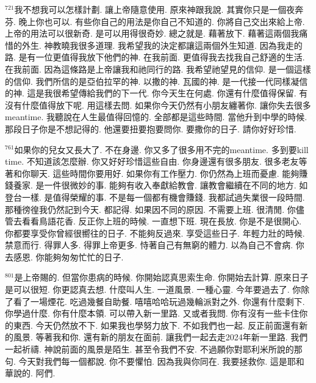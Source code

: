 \documentclass{book}
\begin{document}
$^{721}$我不想我可以怎樣計劃.
讓上帝隨意使用.
原來神跟我說.
其實你只是一個夜奔芬.
晚上你也可以.
有些你自己的用法是你自己不知道的.
你將自己交出來給上帝.
上帝的用法可以很新奇.
是可以用得很奇妙.
總之就是.
藉著放下.
藉著這兩個我痛惜的外生.
神教曉我很多道理.
我希望我的決定都讓這兩個外生知道.
因為我走的路.
是有一位更值得我放下他們的神.
在我前面.
更值得我去找我自己舒適的生活.
在我前面.
因為這條路是上帝讓我和祂同行的路.
我希望祂望見的信仰.
是一個這樣的信仰.
我們所信的是亞伯拉罕的神.
以撒的神.
瓦國的神.
是一代接一代同樣凝信的神.
這是我很希望傳給我們的下一代.
你今天生在何處.
你還有什麼值得保留.
有沒有什麼值得放下呢.
用這樣去問.
如果你今天仍然有小朋友纏著你.
讓你失去很多meantime.
我聽說在人生最值得回憶的.
全部都是這些時間.
當他升到中學的時候.
那段日子你是不想記得的.
他還要扭要抱要問你.
要撒你的日子.
請你好好珍惜.

$^{761}$如果你的兒女又長大了.
不在身邊.
你又多了很多用不完的meantime.
多到要kill time.
不知道該怎麼辦.
你又好好珍惜這些自由.
你身邊還有很多朋友.
很多老友等著和你聊天.
這些時間你要用好.
如果你有工作壓力.
你仍然為上班而憂慮.
能夠賺錢養家.
是一件很微妙的事.
能夠有收入奉獻給教會.
讓教會繼續在不同的地方.
如登台一樣.
是值得榮耀的事.
不是每一個都有機會賺錢.
我都試過失業很一段時間.
那種徬徨我仍然記到今天.
都記得.
如果因不同的原因.
不需要上班.
很清閒.
你儘管去看看鳥語花香.
反正你上班的時候.
一直想下班.
現在長放.
你是不是很開心.
你都要享受你曾經很嚮往的日子.
不能夠反過來.
享受這些日子.
年輕力壯的時候.
禁意而行.
得罪人多.
得罪上帝更多.
恃著自己有無窮的體力.
以為自己不會病.
你去感恩.
你能夠匆匆忙忙的日子.

$^{801}$是上帝賜的.
但當你患病的時候.
你開始認真思索生命.
你開始去計算.
原來日子是可以很短.
你更認真去想.
什麼叫人生.
一道風景.
一種心靈.
今年要過去了.
你除了看了一場煙花.
吃過幾餐自助餐.
嘻嘻哈哈玩過幾輪派對之外.
你還有什麼剩下.
你學過什麼.
你有什麼本領.
可以帶入新一里路.
又或者我問.
你有沒有一些卡住你的東西.
今天仍然放不下.
如果我也學努力放下.
不如我們也一起.
反正前面還有新的風景.
等著我和你.
還有新的朋友在面前.
讓我們一起去走2024年新一里路.
我們一起祈禱.
神說前面的風景是陌生.
甚至令我們不安.
不過願你對耶利米所說的那句.
今天對我們每一個都說.
你不要懼怕.
因為我與你同在.
我要拯救你.
這是耶和華說的.
阿們.
\newpage

\allsectionsfont{\centering}

\setlength\parindent{0pt}
\setlength{\columnsep}{1.25em}
\setlength{\parfillskip}{0pt}
\setlength{\tabcolsep}{1em}
\raggedbottom

\end{document}
